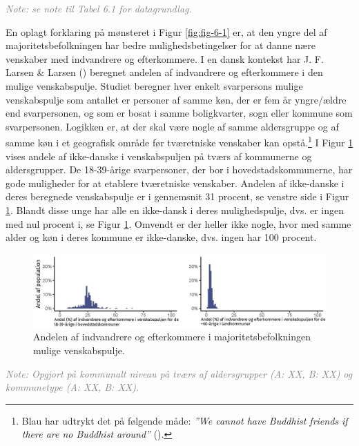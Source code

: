 \documentclass[
]{book}
\begin{document}
\begin{footnotesize}\textit{\textcolor{gray}{
Note: se note til Tabel 6.1 for datagrundlag.
}}
\end{footnotesize}

En oplagt forklaring på mønsteret i Figur \ref{fig:fig-6-1} er, at den yngre del af majoritetsbefolkningen har bedre mulighedsbetingelser for at danne nære venskaber med indvandrere og efterkommere. I en dansk kontekst har J. F. Larsen \& Larsen () beregnet andelen af indvandrere og efterkommere i den mulige venskabspulje. Studiet beregner hver enkelt svarpersons mulige venskabspulje som antallet er personer af samme køn, der er fem år yngre/ældre end svarpersonen, og som er bosat i samme boligkvarter, sogn eller kommune som svarpersonen. Logikken er, at der skal være nogle af samme aldersgruppe og af samme køn i et geografisk område før tværetniske venskaber kan opstå.\footnote{Blau har udtrykt det på følgende måde: \emph{''We cannot have Buddhist friends if there are no Buddhist around''} ().} I Figur \ref{fig:fig-6-2} vises andele af ikke-danske i venskabspuljen på tværs af kommunerne og aldersgrupper. De 18-39-årige svarpersoner, der bor i hovedstadskommunerne, har gode muligheder for at etablere tværetniske venskaber. Andelen af ikke-danske i deres beregnede venskabspulje er i gennemsnit 31 procent, se venstre side i Figur \ref{fig:fig-6-2}. Blandt disse unge har alle en ikke-dansk i deres mulighedspulje, dvs. er ingen med nul procent i, se Figur \ref{fig:fig-6-2}. Omvendt er der heller ikke nogle, hvor med samme alder og køn i deres kommune er ikke-danske, dvs. ingen har 100 procent.

\newpage

\begin{figure}
\includegraphics[width=1\linewidth]{images/Figur_6_2} \caption{Andelen af indvandrere og efterkommere i majoritetsbefolkningen mulige venskabspulje.}\label{fig:fig-6-2}
\end{figure}

\begin{footnotesize}\textit{\textcolor{gray}{
Note: Opgjort på kommunalt niveau på tværs af aldersgrupper (A: XX, B: XX) og kommunetype (A: XX, B: XX).
}}
\end{footnotesize}
\end{document}
